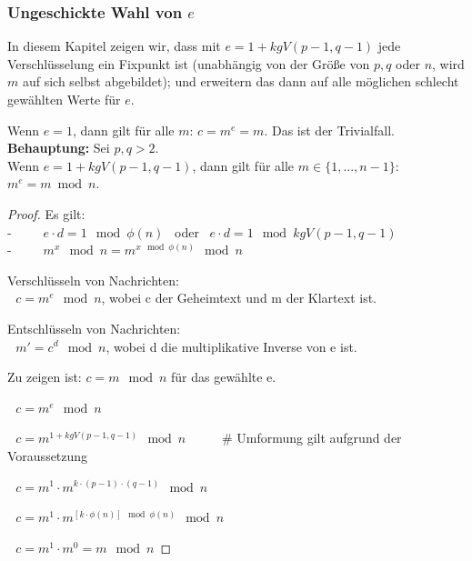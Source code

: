\begin{refsegment}
\vspace{15pt}
\subsubsection{Ungeschickte Wahl von \texorpdfstring{$e$}{e}}%

In diesem Kapitel zeigen wir, dass mit $e=1+kgV(p-1,q-1)$ jede Verschlüsselung ein
Fixpunkt ist (unabhängig von der Größe von $p, q$ oder $n$, wird $m$ auf sich selbst abgebildet);
und erweitern das dann auf alle möglichen schlecht gewählten Werte für $e$.

\noindent Wenn $e=1$, dann gilt für alle $ m$: $ c = m^e = m$. Das ist der Trivialfall.\\

\noindent\textbf{Behauptung:} Sei $p,q > 2$.\\
Wenn $e=1+kgV(p-1,q-1)$, dann gilt für alle $ m \in \{1,...,n-1\}$: $ m^e = m \bmod n$.

\begin{proof}{}
Es gilt:\\
-~~~ $ ~~~ e\cdot d=1 \mod \phi(n)$ ~oder~ $e\cdot d=1 \mod kgV(p-1,q-1) $\\
-~~~ $ ~~~ m^{x} \mod n = m^{x \mod \phi(n)} \mod n $

\noindent Verschlüsseln von Nachrichten:\\
 $~~~c=m^e \mod n$, wobei c der Geheimtext und m der Klartext ist.

\noindent Entschlüsseln von Nachrichten:\\
 $~~~m'=c^d \mod n$, wobei d die multiplikative Inverse von e ist.

\noindent Zu zeigen ist: $c=m \mod n$ für das gewählte e.

$~~~c = m^e \mod n$

$~~~c = m^{1+kgV(p-1,q-1)} \mod n$  ~~~~~\# Umformung gilt aufgrund der Voraussetzung

$~~~c = m^1 \cdot m^{k \cdot (p-1) \cdot (q-1)} \mod n$

$~~~c = m^1 \cdot m^{[k \cdot \phi(n)] \mod \phi(n)} \mod n$

$~~~c = m^1 \cdot m^{0} = m \mod n $
\end{proof}


\end{refsegment}
